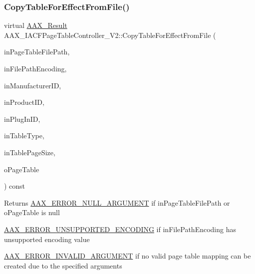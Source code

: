 \subsubsection{\texorpdfstring{CopyTableForEffectFromFile()}{CopyTableForEffectFromFile()}}
{\footnotesize\ttfamily virtual \mbox{\hyperlink{a00392_a4d8f69a697df7f70c3a8e9b8ee130d2f}{A\+A\+X\+\_\+\+Result}} A\+A\+X\+\_\+\+I\+A\+C\+F\+Page\+Table\+Controller\+\_\+\+V2\+::\+Copy\+Table\+For\+Effect\+From\+File (\begin{DoxyParamCaption}\item[{const char $\ast$}]{in\+Page\+Table\+File\+Path,  }\item[{\mbox{\hyperlink{a00491_a8152e57310850693e4e7f00fc4922d74}{A\+A\+X\+\_\+\+E\+Text\+Encoding}}}]{in\+File\+Path\+Encoding,  }\item[{\mbox{\hyperlink{a00392_ab247c0d8686c14e05cbb567ef276f249}{A\+A\+X\+\_\+\+C\+Property\+Value}}}]{in\+Manufacturer\+ID,  }\item[{\mbox{\hyperlink{a00392_ab247c0d8686c14e05cbb567ef276f249}{A\+A\+X\+\_\+\+C\+Property\+Value}}}]{in\+Product\+ID,  }\item[{\mbox{\hyperlink{a00392_ab247c0d8686c14e05cbb567ef276f249}{A\+A\+X\+\_\+\+C\+Property\+Value}}}]{in\+Plug\+In\+ID,  }\item[{uint32\+\_\+t}]{in\+Table\+Type,  }\item[{int32\+\_\+t}]{in\+Table\+Page\+Size,  }\item[{\mbox{\hyperlink{a01409}{I\+A\+C\+F\+Unknown}} $\ast$}]{o\+Page\+Table }\end{DoxyParamCaption}) const\hspace{0.3cm}{\ttfamily [pure virtual]}}





\begin{DoxyReturn}{Returns}
\mbox{\hyperlink{a00494_a5f8c7439f3a706c4f8315a9609811937aa77cf0ad2d545c97b095d8bc19a7c969}{A\+A\+X\+\_\+\+E\+R\+R\+O\+R\+\_\+\+N\+U\+L\+L\+\_\+\+A\+R\+G\+U\+M\+E\+NT}} if {\ttfamily in\+Page\+Table\+File\+Path} or {\ttfamily o\+Page\+Table} is null

\mbox{\hyperlink{a00494_a5f8c7439f3a706c4f8315a9609811937a17a1fd40c029a9337ede3bad778eab3b}{A\+A\+X\+\_\+\+E\+R\+R\+O\+R\+\_\+\+U\+N\+S\+U\+P\+P\+O\+R\+T\+E\+D\+\_\+\+E\+N\+C\+O\+D\+I\+NG}} if {\ttfamily in\+File\+Path\+Encoding} has unsupported encoding value

\mbox{\hyperlink{a00494_a5f8c7439f3a706c4f8315a9609811937a7d27a3bd88231e331c98d85f5b10e2eb}{A\+A\+X\+\_\+\+E\+R\+R\+O\+R\+\_\+\+I\+N\+V\+A\+L\+I\+D\+\_\+\+A\+R\+G\+U\+M\+E\+NT}} if no valid page table mapping can be created due to the specified arguments
\end{DoxyReturn}


